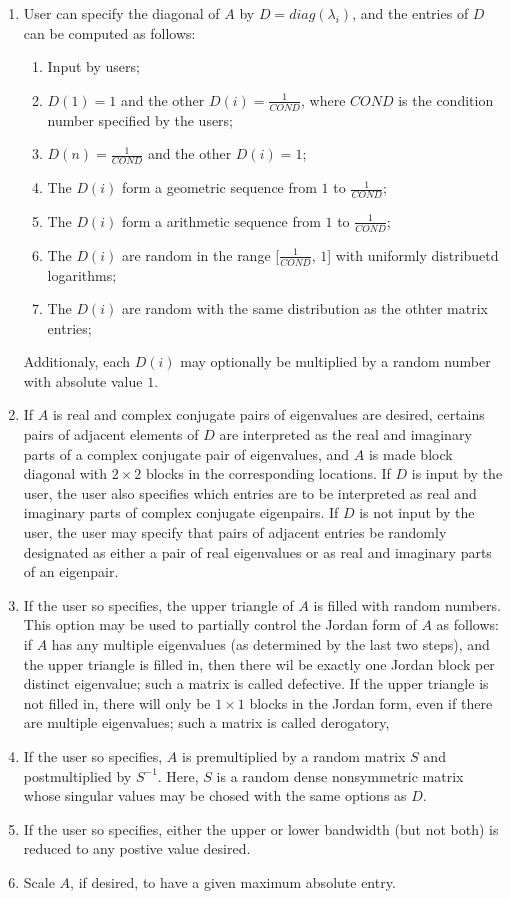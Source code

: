 \begin{enumerate}
	\item User can specify the diagonal of $A$ by $D=diag(\lambda_i)$, and the entries of $D$ can be computed as follows:
	\begin{enumerate}
		\item Input by users;
		\item $D(1)=1$ and the other $D(i)=\frac{1}{COND}$, where $COND$ is the condition number specified by the users;
		\item $D(n)=\frac{1}{COND}$ and the other $D(i)=1$;
		\item The $D(i)$ form a geometric sequence from $1$ to $\frac{1}{COND}$;
		\item The $D(i)$ form a arithmetic sequence from $1$ to $\frac{1}{COND}$;
		\item The $D(i)$ are random in the range [$\frac{1}{COND}$, $1$] with uniformly distribuetd logarithms;
		\item The $D(i)$ are random with the same distribution as the othter matrix entries;
	\end{enumerate}
	
	Additionaly, each $D(i)$ may optionally be multiplied by a random number with absolute value $1$.
	
	\item If $A$ is real and complex conjugate pairs of eigenvalues are desired, certains pairs of adjacent elements of $D$ are interpreted as the real and imaginary parts of a complex conjugate pair of eigenvalues, and $A$ is made block diagonal with $2 \times 2$ blocks in the corresponding locations. If $D$ is input by the user, the user also specifies which entries are to be interpreted as real and imaginary parts of complex conjugate eigenpairs. If $D$ is not input by the user, the user may specify that pairs of adjacent entries be randomly designated as either a pair of real eigenvalues or as real and imaginary parts of an eigenpair.
	
	\item If the user so specifies, the upper triangle of $A$ is filled with random numbers. This option may be used to partially control the Jordan form of $A$ as follows: if $A$ has any multiple eigenvalues (as determined by the last two steps), and the upper triangle is filled in, then there wil be exactly one Jordan block per distinct eigenvalue; such a matrix is called defective. If the upper triangle is not filled in, there will only be $1\times1$ blocks in the Jordan form, even if there are multiple eigenvalues; such a matrix is called derogatory,
	
	\item If the user so specifies, $A$ is premultiplied by a random matrix $S$ and postmultiplied by $S^{-1}$. Here, $S$ is a random dense nonsymmetric matrix whose singular values may be chosed with the same options as $D$. 
	\item If the user so specifies, either the upper or lower bandwidth (but not both) is reduced to any postive value desired.
	\item Scale $A$, if desired, to have a given maximum absolute entry.
\end{enumerate}

